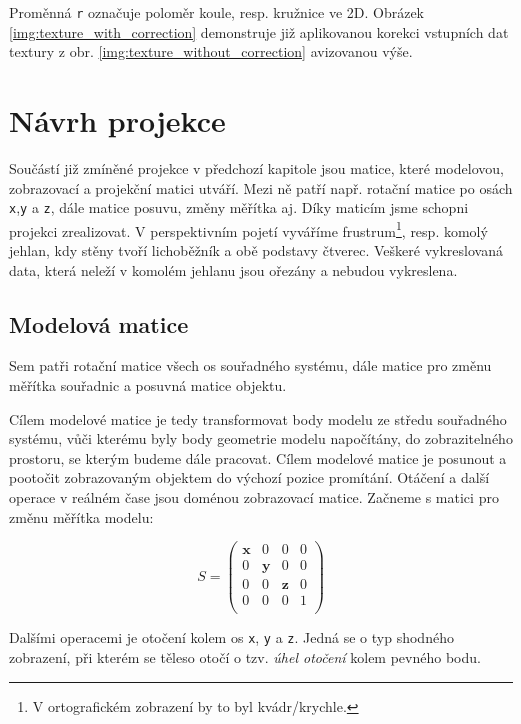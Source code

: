 Proměnná \texttt{r} označuje poloměr koule, resp. kružnice ve 2D. Obrázek \ref{img:texture_with_correction} demonstruje již aplikovanou  korekci vstupních dat  textury z obr. \ref{img:texture_without_correction} avizovanou výše.
 

\newpage


\section{Návrh projekce}
Součástí již zmíněné projekce v předchozí kapitole jsou matice, které modelovou, zobrazovací a projekční matici utváří. Mezi ně patří např. rotační matice po osách \texttt{x},\texttt{y} a \texttt{z}, dále matice posuvu, změny měřítka aj. Díky maticím jsme schopni projekci zrealizovat. V perspektivním pojetí vyváříme frustrum\footnote{V ortografickém zobrazení by to byl kvádr/krychle.}, resp. komolý jehlan, kdy stěny tvoří lichoběžník a obě podstavy čtverec. Veškeré vykreslovaná data, která neleží v komolém jehlanu jsou ořezány  a nebudou vykreslena. 




\subsection{Modelová matice}
Sem patři rotační matice všech os souřadného systému, dále matice pro změnu měřítka souřadnic a posuvná matice objektu.

Cílem modelové matice je tedy transformovat body modelu ze středu souřadného systému, vůči kterému byly body geometrie modelu napočítány, do zobrazitelného prostoru, se kterým budeme dále pracovat. Cílem modelové matice je posunout a pootočit zobrazovaným objektem do výchozí pozice promítání. Otáčení a další operace v reálném čase jsou  doménou zobrazovací matice. Začneme s matici pro změnu měřítka modelu:

$$
S =
\begin{pmatrix} 
\textbf{x} & 0 & 0 & 0\\
0 & \textbf{y} & 0 & 0\\ 
0 & 0 & \textbf{z} & 0\\ 
0 & 0 & 0 & 1\\ 
\end{pmatrix}$$

Dalšími operacemi je otočení kolem os \texttt{x}, \texttt{y} a \texttt{z}. Jedná se o typ shodného zobrazení, při kterém se těleso otočí o tzv. \textit{úhel otočení} kolem pevného bodu. \cite{Kompendium}
\newline


